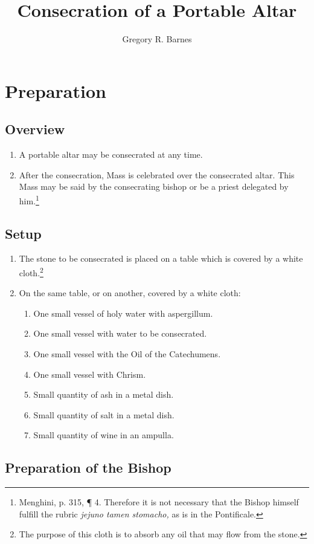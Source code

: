 \documentclass[twocolumn]{report}
\title{Consecration of a Portable Altar}
\author{Gregory R. Barnes}
\begin{document}
	\maketitle
\section*{Preparation}
\subsection*{Overview}
\begin{enumerate}
	\item A portable altar may be consecrated at any time.
	\item After the consecration, Mass is celebrated over the  consecrated altar. This Mass may be said by the consecrating bishop or be a priest delegated by him.\footnote{Menghini, p. 315, \P{} 4. Therefore it is not necessary that the Bishop himself fulfill the rubric \textit{jejuno tamen stomacho,} as is in the Pontificale.}
\end{enumerate}
\subsection*{Setup}
\begin{enumerate}
	\item The stone to be consecrated is placed on a table which is covered by a white cloth.\footnote{The purpose of this cloth is to absorb any oil that may flow from the stone.}
	\item On the same table, or on another, covered by a white cloth:
	\begin{enumerate}
		\item One small vessel of holy water with aspergillum.
		\item One small vessel with water to be consecrated.
		\item One small vessel with the Oil of the Catechumens.
		\item One small vessel with Chrism.
		\item Small quantity of ash in a metal dish.
		\item Small quantity of salt in a metal dish.
		\item Small quantity of wine in an ampulla.
	\end{enumerate}
\end{enumerate}
\subsection*{Preparation of the Bishop}
\end{document}
